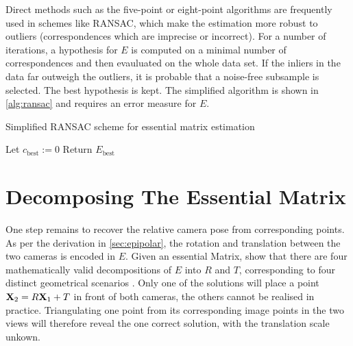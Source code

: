 Direct methods such as the five-point or eight-point algorithms are frequently
used in schemes like RANSAC, which make the estimation more robust to outliers
(correspondences which are imprecise or incorrect). For a number of iterations,
a hypothesis for $E$ is computed on a minimal number of correspondences and then
evauluated on the whole data set. If the inliers in the data far outweigh the
outliers, it is probable that a noise-free subsample is selected. The best hypothesis is kept.
The simplified algorithm is shown in \autoref{alg:ransac}
\citep[c.f.][chapter 4.8]{h&z2004} and requires an error measure for $E$.

\begin{algorithm}
   \caption{Simplified RANSAC scheme for essential matrix estimation}
   \label{alg:ransac}
   Let $c_{\text{best}} := 0$\;
   Return $E_{\text{best}}$
\end{algorithm}

\section{Decomposing The Essential Matrix}

One step remains to recover the relative camera pose from corresponding points.
As per the derivation in \autoref{sec:epipolar}, the rotation and translation
between the two cameras is encoded in $E$. Given an essential Matrix,
\citet[chapter 9.6]{h&z2004} show that there are four mathematically valid
decompositions of $E$ into $R$ and $T$, corresponding to four distinct
geometrical scenarios \citep[see][chapter 9.6]{h&z2004}. Only one of the
solutions will place a point $\mathbf{X}_2 = R\mathbf{X}_1 + T$ in front of both
cameras, the others cannot be realised in practice.  Triangulating one point
from its corresponding image points in the two views will therefore reveal the
one correct solution, with the translation scale unkown.
